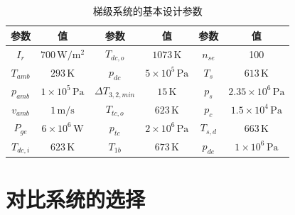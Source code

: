 \begin{table}[htbp]
\setlength{\abovecaptionskip}{-10pt}
	\caption{梯级系统的基本设计参数}
	\begin{center}
	\begin{tabular}{cccccc}
		\toprule
		参数		&	值	&	参数		&	值	&	参数		&	值\\
		\midrule
		$I_r$		&	$700\,\mathrm{W/m^2}$	&	$T_{dc,o}$	&	$1073\,\mathrm{K}$	&	$n_{se}$	&	100\\
		$T_{amb}$	&	$293\,\mathrm{K}$	&	$p_{dc}$		&	$5\times10^5\,\mathrm{Pa}$	&	$T_s$	&	$613\,\mathrm{K}$\\
		$p_{amb}$	&	$1\times10^5\,\mathrm{Pa}$	&	$\Delta{}T_{3,2,min}$	&	$15\,\mathrm{K}$	&	$p_s$	&	$2.35\times10^6\,\mathrm{Pa}$\\
		$v_{amb}$	&	$1\,\mathrm{m/s}$	&	$T_{tc,o}$	&	$623\,\mathrm{K}$	&	$p_c$	&	$1.5\times10^4\,\mathrm{Pa}$\\
		$P_{ge}$	&	$6\times10^6\,\mathrm{W}$	&	
$p_{tc}$	&	$2\times10^6\,\mathrm{Pa}$	&	$T_{s,d}$	&	$663\,\mathrm{K}$\\
		$T_{dc,i}$		&	$623\,\mathrm{K}$	&	$T_{1b}$	&	$673\,\mathrm{K}$	&	$p_{de}$ 	& 	$1\times10^6\,\mathrm{Pa}$\\			
		\bottomrule
	\end{tabular}
	\end{center}
	\label{tab:CascadeSystemParameters}
\end{table}

\section{对比系统的选择}

